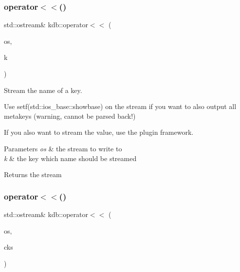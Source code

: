\subsubsection{\texorpdfstring{operator$<$$<$()}{operator<<()}\hspace{0.1cm}{\footnotesize\ttfamily [1/2]}}
{\footnotesize\ttfamily std\+::ostream\& kdb\+::operator$<$$<$ (\begin{DoxyParamCaption}\item[{std\+::ostream \&}]{os,  }\item[{\mbox{\hyperlink{classkdb_1_1Key}{kdb\+::\+Key}} const \&}]{k }\end{DoxyParamCaption})\hspace{0.3cm}{\ttfamily [inline]}}



Stream the name of a key. 

Use setf(std\+::ios\+\_\+base\+::showbase) on the stream if you want to also output all metakeys (warning, cannot be parsed back!)

If you also want to stream the value, use the plugin framework.


\begin{DoxyParams}{Parameters}
{\em os} & the stream to write to \\
\hline
{\em k} & the key which name should be streamed\\
\hline
\end{DoxyParams}
\begin{DoxyReturn}{Returns}
the stream 
\end{DoxyReturn}
\mbox{\label{namespacekdb_afd28754a48d420d2f2a41c5d8242f3fb}} 
\subsubsection{\texorpdfstring{operator$<$$<$()}{operator<<()}\hspace{0.1cm}{\footnotesize\ttfamily [2/2]}}
{\footnotesize\ttfamily std\+::ostream\& kdb\+::operator$<$$<$ (\begin{DoxyParamCaption}\item[{std\+::ostream \&}]{os,  }\item[{\mbox{\hyperlink{classkdb_1_1KeySet}{kdb\+::\+Key\+Set}} const \&}]{cks }\end{DoxyParamCaption})\hspace{0.3cm}{\ttfamily [inline]}}



